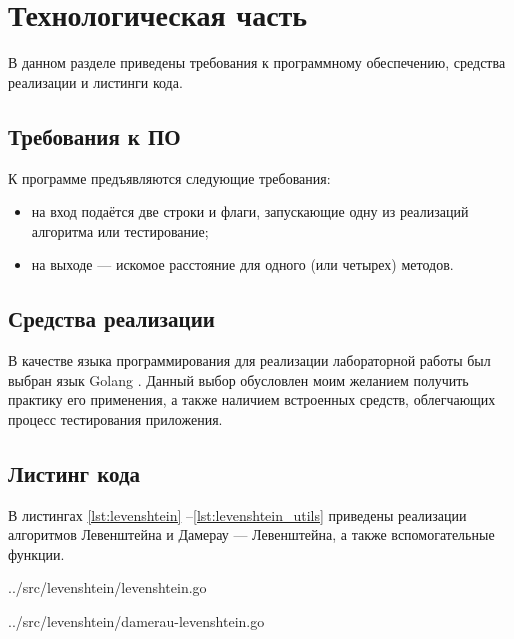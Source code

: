 \chapter{Технологическая часть}

В данном разделе приведены требования к программному обеспечению, средства реализации и листинги кода.

\section{Требования к ПО}

К программе предъявляются следующие требования:
\begin{itemize}
	\item на вход подаётся две строки и флаги, запускающие одну из реализаций алгоритма или тестирование;
	\item на выходе — искомое расстояние для одного (или четырех) методов.
\end{itemize}

\section{Средства реализации}

В качестве языка программирования для реализации лабораторной работы был выбран язык Golang \cite{golang}. Данный выбор обусловлен моим желанием получить практику его применения, а также наличием встроенных средств, облегчающих процесс тестирования приложения.

\section{Листинг кода}

В листингах \ref{lst:levenshtein} --\ref{lst:levenshtein_utils} приведены реализации алгоритмов Левенштейна и Дамерау — Левенштейна, а также вспомогательные функции.

\begin{lstinputlisting}[
	caption={Реализация алгоритмов Левенштейна},
	label={lst:levenshtein},
	style=go
]{../src/levenshtein/levenshtein.go}
\end{lstinputlisting}

\begin{lstinputlisting}[
	caption={Реализация алгоритмов Дамерау -- Левенштейна},
	label={lst:damerau_levenshtein},
	style=go
]{../src/levenshtein/damerau-levenshtein.go}
\end{lstinputlisting}

